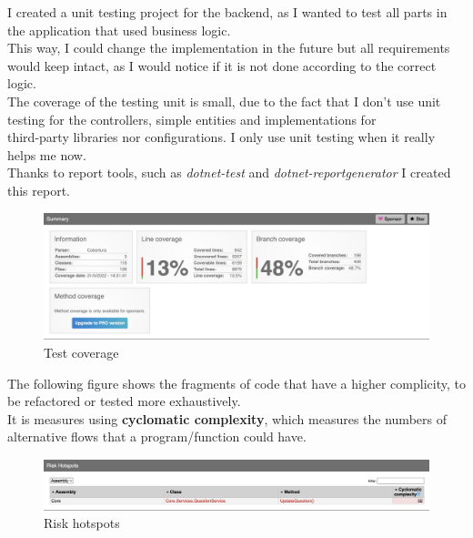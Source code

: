 I created a unit testing project for the backend, as I wanted to test all parts in the application that used business logic. \\
This way, I could change the implementation in the future but all requirements would keep intact, as I would notice if it is not done according to the correct logic. \\

The coverage of the testing unit is small, due to the fact that I don't use unit testing for the controllers, simple entities and implementations for \\
third-party libraries nor configurations. I only use unit testing when it really helps me now. \\

Thanks to report tools, such as \textit{dotnet-test} and \textit{dotnet-reportgenerator} \cite{Coverage} I created this report.

\begin{figure}[H]
    \centering
        \includegraphics[width=\textwidth]{assets/coverage.png}
    \caption{Test coverage}
    \label{fig:test_coverage}
\end{figure}

The following figure shows the fragments of code that have a higher complicity, to be refactored or tested more exhaustively. \\
It is measures using \textbf{cyclomatic complexity}, which measures the numbers of alternative flows that a program/function could have.
\begin{figure}[H]
    \centering
        \includegraphics[width=\textwidth]{assets/risk_hotpots.png}
    \caption{Risk hotspots}
    \label{fig:test_hotspots}
\end{figure}

